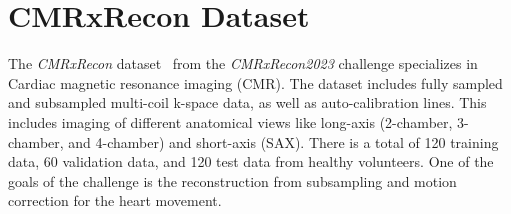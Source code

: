 \documentclass[english,version-2022-01]{uzl-thesis} %
\begin{document}
\section{CMRxRecon Dataset} \label{Sec:CMRxRecon}
The \emph{CMRxRecon} dataset~\cite{CMRxRecon} from the \emph{CMRxRecon2023} challenge specializes in Cardiac magnetic resonance imaging (CMR). The dataset includes 
fully sampled and subsampled multi-coil k-space data, as well as auto-calibration lines. This includes imaging of different anatomical views like long-axis (2-chamber, 3-chamber, and 4-chamber) and short-axis (SAX). There is a total of 120 training data, 60 validation data, and 120 test data from healthy volunteers. One of the goals of the challenge is the reconstruction from subsampling and motion correction for the heart movement.
\end{document}
